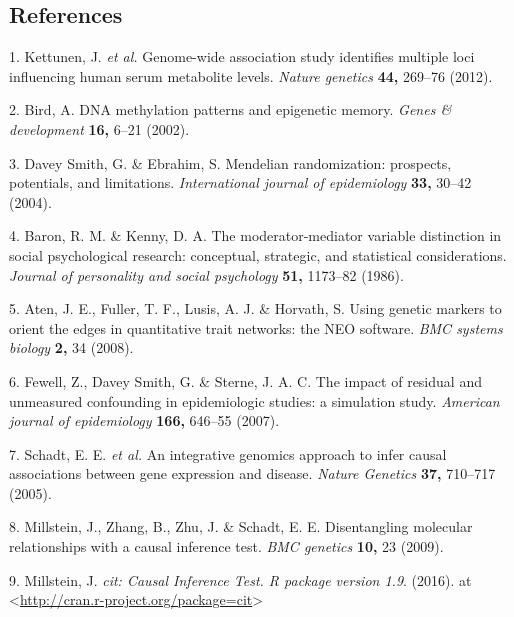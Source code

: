 \documentclass[]{article}
\begin{document}
\subsection*{References}\label{references}

\hypertarget{refs}{}
\hypertarget{ref-Kettunen2012}{}
1. Kettunen, J. \emph{et al.} Genome-wide association study identifies
multiple loci influencing human serum metabolite levels. \emph{Nature
genetics} \textbf{44,} 269--76 (2012).

\hypertarget{ref-Bird2002}{}
2. Bird, A. DNA methylation patterns and epigenetic memory. \emph{Genes
\& development} \textbf{16,} 6--21 (2002).

\hypertarget{ref-DaveySmith2004}{}
3. Davey Smith, G. \& Ebrahim, S. Mendelian randomization: prospects,
potentials, and limitations. \emph{International journal of
epidemiology} \textbf{33,} 30--42 (2004).

\hypertarget{ref-Baron1986}{}
4. Baron, R. M. \& Kenny, D. A. The moderator-mediator variable
distinction in social psychological research: conceptual, strategic, and
statistical considerations. \emph{Journal of personality and social
psychology} \textbf{51,} 1173--82 (1986).

\hypertarget{ref-Aten2008}{}
5. Aten, J. E., Fuller, T. F., Lusis, A. J. \& Horvath, S. Using genetic
markers to orient the edges in quantitative trait networks: the NEO
software. \emph{BMC systems biology} \textbf{2,} 34 (2008).

\hypertarget{ref-Fewell2007}{}
6. Fewell, Z., Davey Smith, G. \& Sterne, J. A. C. The impact of
residual and unmeasured confounding in epidemiologic studies: a
simulation study. \emph{American journal of epidemiology} \textbf{166,}
646--55 (2007).

\hypertarget{ref-Schadt2005}{}
7. Schadt, E. E. \emph{et al.} An integrative genomics approach to infer
causal associations between gene expression and disease. \emph{Nature
Genetics} \textbf{37,} 710--717 (2005).

\hypertarget{ref-Millstein2009}{}
8. Millstein, J., Zhang, B., Zhu, J. \& Schadt, E. E. Disentangling
molecular relationships with a causal inference test. \emph{BMC
genetics} \textbf{10,} 23 (2009).

\hypertarget{ref-Millstein2016}{}
9. Millstein, J. \emph{cit: Causal Inference Test. R package version
1.9}. (2016). at
\textless{}\url{http://cran.r-project.org/package=cit}\textgreater{}
\end{document}
